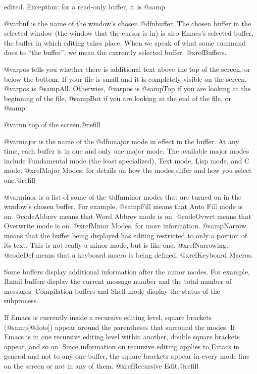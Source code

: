 edited.  Exception: for a read-only buffer, it is @samp{%

  @var{buf} is the name of the window's chosen @dfn{buffer}.  The chosen
buffer in the selected window (the window that the cursor is in) is also
Emacs's selected buffer, the buffer in which editing takes place.  When
we speak of what some command does to ``the buffer'', we mean the
currently selected buffer.  @xref{Buffers}.

  @var{pos} tells you whether there is additional text above the top of
the screen, or below the bottom.  If your file is small and it is
completely visible on the screen, @var{pos} is @samp{All}.  Otherwise, 
@var{pos} is @samp{Top} if you are looking at the beginning of the file,
@samp{Bot} if you are looking at the end of the file, or
@samp{@var{nn}%
top of the screen.@refill

  @var{major} is the name of the @dfn{major mode} in effect in the buffer.  At
any time, each buffer is in one and only one major mode.
The available major modes include Fundamental mode (the least specialized),
Text mode, Lisp mode, and C mode.  @xref{Major Modes}, for details
on how the modes differ and how you select one.@refill

  @var{minor} is a list of some of the @dfn{minor modes} that are turned on
in the window's chosen buffer.  For example, @samp{Fill} means that Auto
Fill mode is on.  @code{Abbrev} means that Word Abbrev mode is on.
@code{Ovwrt} means that Overwrite mode is on.  @xref{Minor Modes}, for more
information.  @samp{Narrow} means that the buffer being displayed has
editing restricted to only a portion of its text.  This is not really a
minor mode, but is like one.  @xref{Narrowing}.  @code{Def} means that a
keyboard macro is being defined.  @xref{Keyboard Macros}.

  Some buffers display additional information after the minor modes.  For
example, Rmail buffers display the current message number and the total
number of messages.  Compilation buffers and Shell mode display the status
of the subprocess.

  If Emacs is currently inside a recursive editing level, square
brackets (@samp{[@dots{}]}) appear around the parentheses that surround
the modes.  If Emacs is in one recursive editing level within another,
double square brackets appear, and so on.  Since information on
recursive editing applies to Emacs in general and not to any one buffer,
the square brackets appear in every mode line on the screen or not in
any of them.  @xref{Recursive Edit}.@refill

}}
